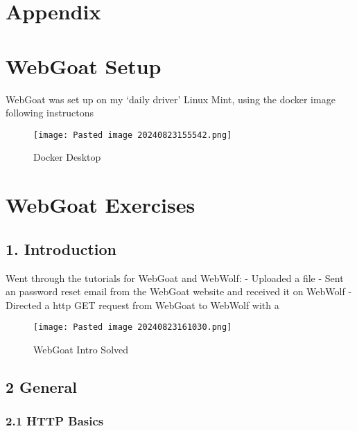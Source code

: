 \documentclass[
	letterpaper, %
	10pt, %
	unnumberedsections, %
	twoside, %
]{APAAssignment}
\begin{document}
\clearpage
\begin{appendices}
\onecolumn
\appendix
\section{Appendix} \label{Appendix}


\hypertarget{webgoat-setup}{%
\section{WebGoat Setup}\label{webgoat-setup}}

WebGoat was set up on my `daily driver' Linux Mint, using the docker
image following instructons

\begin{figure}[!h] %
	\texttt{[image: Pasted image 20240823155542.png]}
	\caption{Docker Desktop}
	\label{fig:Docker-Desktop}
\end{figure}




\hypertarget{webgoat-exercises}{%
\section{WebGoat Exercises}\label{webgoat-exercises}}

\hypertarget{introduction}{%
\subsection{1. Introduction}\label{introduction}}

Went through the tutorials for WebGoat and WebWolf: - Uploaded a file -
Sent an password reset email from the WebGoat website and received it on
WebWolf - Directed a http GET request from WebGoat to WebWolf with a


\begin{figure} %
	\texttt{[image: Pasted image 20240823161030.png]}
	\caption{WebGoat Intro Solved}
	\label{fig:WebGoat Intro}
\end{figure}



\hypertarget{general}{%
\subsection{2 General}\label{general}}

\hypertarget{http-basics}{%
\subsubsection{2.1 HTTP Basics}\label{http-basics}}


\end{appendices}
\end{document}
